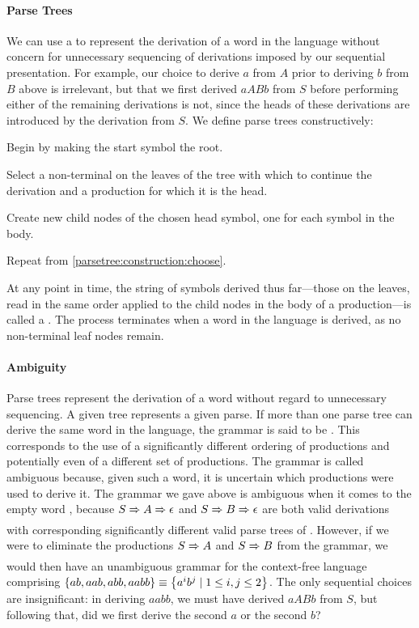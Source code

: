\paragraph{Parse Trees} We can use a  to represent the derivation of a word in the language without concern for unnecessary sequencing of derivations imposed by our sequential presentation. For example, our choice to derive $a$ from $A$ prior to deriving $b$ from $B$ above is irrelevant, but that we first derived $aABb$ from $S$ before performing either of the remaining derivations is not, since the heads of these derivations are introduced by the derivation from $S$. We define parse trees constructively: 
\begin{aenumerate}
\item Begin by making the start symbol the root.
\item\label{parsetree:construction:choose} Select a non-terminal on the leaves of the tree with which to continue the derivation and a production for which it is the head.
\item Create new child nodes of the chosen head symbol, one for each symbol in the body.
\item Repeat from \ref{parsetree:construction:choose}.
\end{aenumerate}
At any point in time, the string of symbols derived thus far---those on the leaves, read in the same order applied to the child nodes in the body of a production---is called a . The process terminates when a word in the language is derived, as no non-terminal leaf nodes remain.

\paragraph{Ambiguity} Parse trees represent the derivation of a word without regard to unnecessary sequencing. A given tree represents a given parse. If more than one parse tree can derive the same word in the language, the grammar is said to be . This corresponds to the use of a significantly different ordering of productions and potentially even of a different set of productions. The grammar is called ambiguous because, given such a word, it is uncertain which productions were used to derive it. The grammar we gave above is ambiguous when it comes to the empty word \emptyword, because $S \derives A \derives \emptyword$ and $S \derives B \derives \emptyword$ are both valid derivations with corresponding significantly different valid parse trees of \emptyword. However, if we were to eliminate the productions $S \derives A$ and $S \derives B$ from the grammar, we would then have an unambiguous grammar for the context-free language comprising $\left\{ ab, aab, abb, aabb \right\} \equiv \left\{ a^{i}b^{j} \mid 1 \leq i, j \leq 2 \right\}$. The only sequential choices are insignificant: in deriving $aabb$, we must have derived $aABb$ from $S$, but following that, did we first derive the second $a$ or the second $b$?

